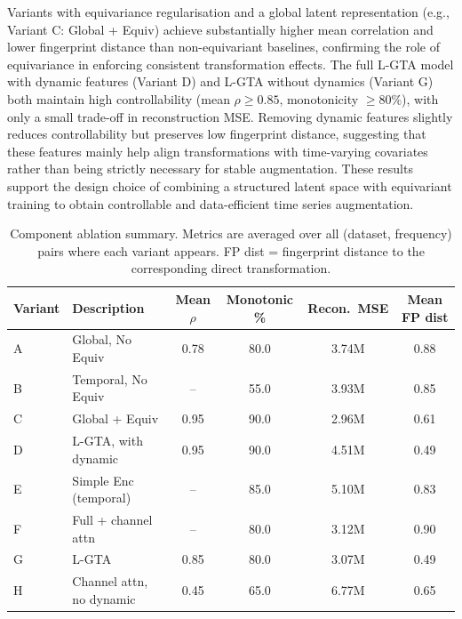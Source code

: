 Variants with equivariance regularisation and a global latent representation (e.g., Variant C: Global + Equiv) achieve substantially higher mean correlation and lower fingerprint distance than non-equivariant baselines, confirming the role of equivariance in enforcing consistent transformation effects. The full L-GTA model with dynamic features (Variant D) and L-GTA without dynamics (Variant G) both maintain high controllability (mean $\rho \geq 0.85$, monotonicity $\geq 80\%$), with only a small trade-off in reconstruction MSE. Removing dynamic features slightly reduces controllability but preserves low fingerprint distance, suggesting that these features mainly help align transformations with time-varying covariates rather than being strictly necessary for stable augmentation. These results support the design choice of combining a structured latent space with equivariant training to obtain controllable and data-efficient time series augmentation.

\begin{table}[h]
\centering
\caption{Component ablation summary. Metrics are averaged over all (dataset, frequency) pairs where each variant appears. FP dist = fingerprint distance to the corresponding direct transformation.}
\label{tab:ablation-summary}
\begin{tabular}{llcccc}
\toprule
\textbf{Variant} & \textbf{Description} & \textbf{Mean $\rho$} & \textbf{Monotonic \%} & \textbf{Recon.\ MSE} & \textbf{Mean FP dist} \\
\midrule
A & Global, No Equiv & 0.78 & 80.0 & 3.74M & 0.88 \\
B & Temporal, No Equiv & -- & 55.0 & 3.93M & 0.85 \\
C & Global + Equiv & 0.95 & 90.0 & 2.96M & 0.61 \\
D & L-GTA, with dynamic & 0.95 & 90.0 & 4.51M & 0.49 \\
E & Simple Enc (temporal) & -- & 85.0 & 5.10M & 0.83 \\
F & Full + channel attn & -- & 80.0 & 3.12M & 0.90 \\
G & L-GTA & 0.85 & 80.0 & 3.07M & 0.49 \\
H & Channel attn, no dynamic & 0.45 & 65.0 & 6.77M & 0.65 \\
\bottomrule
\end{tabular}
\end{table}
